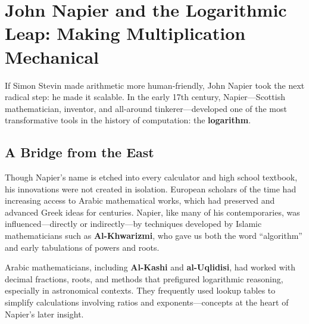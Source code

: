 \section{John Napier and the Logarithmic Leap: Making Multiplication Mechanical}

If Simon Stevin made arithmetic more human-friendly, John Napier took the next radical step: he made it scalable. In the early 17th century, Napier—Scottish mathematician, inventor, and all-around tinkerer—developed one of the most transformative tools in the history of computation: the \textbf{logarithm}.

\subsection{A Bridge from the East}

Though Napier’s name is etched into every calculator and high school textbook, his innovations were not created in isolation. European scholars of the time had increasing access to Arabic mathematical works, which had preserved and advanced Greek ideas for centuries. Napier, like many of his contemporaries, was influenced—directly or indirectly—by techniques developed by Islamic mathematicians such as \textbf{Al-Khwarizmi}, who gave us both the word “algorithm” and early tabulations of powers and roots.

Arabic mathematicians, including \textbf{Al-Kashi} and \textbf{al-Uqlidisi}, had worked with decimal fractions, roots, and methods that prefigured logarithmic reasoning, especially in astronomical contexts. They frequently used lookup tables to simplify calculations involving ratios and exponents—concepts at the heart of Napier’s later insight.

